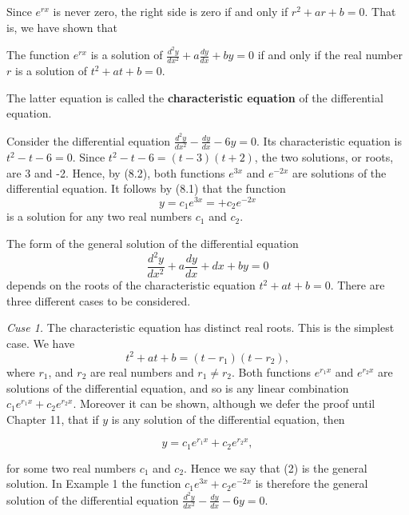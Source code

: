 \noindent Since $e^{rx}$ is never zero, the right side is zero if and only if $r^2 + ar + b = 0$. 
That is, we have shown that

\begin{theorem} %
The function $e^{rx}$ is a solution of $\frac{d^{2}y}{dx^2} + a \frac{dy}{dx} + by = 0$ 
if and only if the real number $r$ is a solution of $t^2 + at + b = 0$.
\end{theorem}

The latter equation is called the \textbf{characteristic equation} of the differential equation.
\medskip

\begin{example}
Consider the differential equation $\frac{d^{2}y}{dx^2} - \frac{dy}{dx} - 6y = 0$. 
Its characteristic equation is $t^2 - t - 6 = 0$. 
Since $t^2 - t - 6 = (t - 3)(t + 2)$, the two solutions, or roots, are 3 and -2. Hence, by (8.2), 
both functions $e^{3x}$ and $e^{-2x}$ are solutions of the differential equation.  
It follows by (8.1) that the function 
$$
y = c_{1} e^{3x} = + c_{2}e^{-2x}
$$
\noindent is a solution for any two real numbers $c_1$ and $c_2$.
\end{example}

The form of the general solution of the differential equation
$$
\frac{d^{2}y}{dx^{2}} + a \frac{dy}{dx} + dx + by = 0
$$
\noindent depends on the roots of the characteristic equation $t^2 + at + b = 0$. 
There are three different cases to be considered.
\medskip

\textit{Cuse 1.}  The characteristic equation has distinct real roots. This is the simplest case. 
We have
$$
t^2 + at + b = (t - r_1)(t - r_2),
$$
\noindent where $r_1$, and $r_2$ are real numbers and $r_{1} \neq r_2$. Both functions $e^{r_{1}x}$ and $e^{r_{2}x}$ are solutions of the differential equation, and so is any linear combination $c_{1}e^{r_{1}x} + c_{2}e^{r_{2}x}$. Moreover it can be shown, although we 
defer the proof until Chapter 11, that if $y$ is any solution of the differential equation, then


\begin{equation}
y = c_{1}e^{r_{1}x} + c_{2}e^{r_{2}x} ,
\label{eq6.8.2}
\end{equation}

\noindent for some two real numbers $c_1$ and $c_2$. Hence we say that (2) is the general solution. In Example 1 the function $c_{1}e^{3x} + c_{2}e^{-2x}$ is therefore the general solution 
of the differential equation $\frac{d^{2}y}{dx^2} - \frac{dy}{dx} - 6y = 0$.
\medskip

